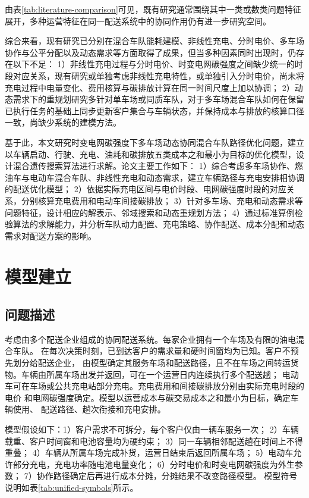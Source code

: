 \documentclass{setp-new}
\begin{document}
由表\ref{tab:literature-comparison}可见，既有研究通常围绕其中一类或数类问题特征展开，多种运营特征在同一配送系统中的协同作用仍有进一步研究空间。

综合来看，现有研究已分别在混合车队能耗建模、非线性充电、分时电价、多车场协作与公平分配以及动态需求等方面取得了成果，但当多种因素同时出现时，仍存在以下不足：
1）非线性充电过程与分时电价、时变电网碳强度之间缺少统一的时段对应关系，现有研究或单独考虑非线性充电特性，或单独引入分时电价，尚未将充电过程中电量变化、费用核算与碳排放计算在同一时间尺度上加以协调；
2）动态需求下的重规划研究多针对单车场或同质车队，对于多车场混合车队如何在保留已执行任务的基础上同步更新客户集合与车辆状态，并保持成本与排放的核算口径一致，尚缺少系统的建模方法。

基于此，本文研究时变电网碳强度下多车场动态协同混合车队路径优化问题，建立以车辆启动、行驶、充电、油耗和碳排放五类成本之和最小为目标的优化模型，设计混合遗传搜索算法进行求解。论文主要工作如下：
1）综合考虑多车场协作、燃油车与电动车混合车队、非线性充电和动态需求，建立车辆路径与充电安排相协调的配送优化模型；
2）依据实际充电区间与电价时段、电网碳强度时段的对应关系，分别核算充电费用和电动车间接碳排放；
3）针对多车场、充电和动态需求等问题特征，设计相应的解表示、邻域搜索和动态重规划方法；
4）通过标准算例检验算法的求解能力，并分析车队动力配置、充电策略、协作配送、成本分配和动态需求对配送方案的影响。
\section{模型建立}

\subsection{问题描述}

考虑由多个配送企业组成的协同配送系统。每家企业拥有一个车场及有限的油电混合车队。
在每次决策时刻，已到达客户的需求量和硬时间窗均为已知。客户不预先划分给配送企业，
由模型确定其服务车场和配送路径，且不在车场之间转运货物。车辆由所属车场出发并返回，可在一个运营日内连续执行多个配送趟；
电动车可在车场或公共充电站部分充电。充电费用和间接碳排放分别由实际充电时段的电价
和电网碳强度确定。模型以运营成本与碳交易成本之和最小为目标，确定车辆使用、
配送路径、趟次衔接和充电安排。

模型假设如下：1）客户需求不可拆分，每个客户仅由一辆车服务一次；
2）车辆载重、客户时间窗和电池容量均为硬约束；
3）同一车辆相邻配送趟在时间上不得重叠；
4）车辆从所属车场完成补货，运营日结束后返回所属车场；
5）电动车允许部分充电，充电功率随电池电量变化；
6）分时电价和时变电网碳强度为外生参数；
7）协作路径确定后再进行成本分摊，分摊结果不改变路径模型。
模型符号说明如表\ref{tab:unified-symbols}所示。
\end{document}
